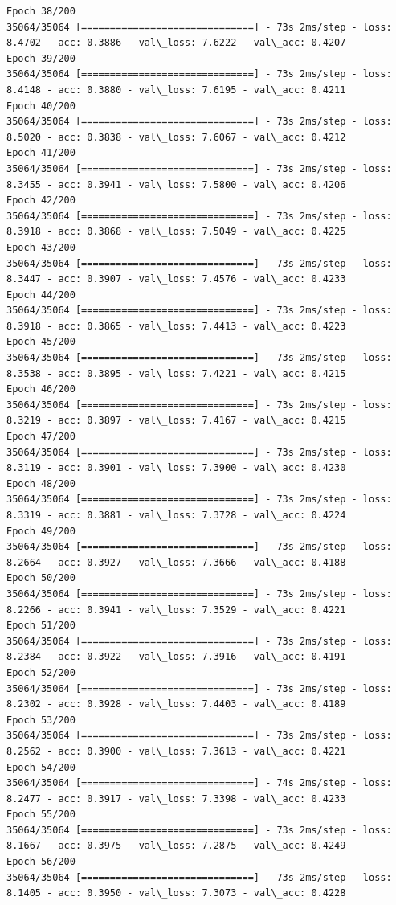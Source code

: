 \documentclass[11pt]{article}
\begin{document}
\begin{Verbatim}[commandchars=\\\{\}]
Epoch 38/200
35064/35064 [==============================] - 73s 2ms/step - loss: 8.4702 - acc: 0.3886 - val\_loss: 7.6222 - val\_acc: 0.4207
Epoch 39/200
35064/35064 [==============================] - 73s 2ms/step - loss: 8.4148 - acc: 0.3880 - val\_loss: 7.6195 - val\_acc: 0.4211
Epoch 40/200
35064/35064 [==============================] - 73s 2ms/step - loss: 8.5020 - acc: 0.3838 - val\_loss: 7.6067 - val\_acc: 0.4212
Epoch 41/200
35064/35064 [==============================] - 73s 2ms/step - loss: 8.3455 - acc: 0.3941 - val\_loss: 7.5800 - val\_acc: 0.4206
Epoch 42/200
35064/35064 [==============================] - 73s 2ms/step - loss: 8.3918 - acc: 0.3868 - val\_loss: 7.5049 - val\_acc: 0.4225
Epoch 43/200
35064/35064 [==============================] - 73s 2ms/step - loss: 8.3447 - acc: 0.3907 - val\_loss: 7.4576 - val\_acc: 0.4233
Epoch 44/200
35064/35064 [==============================] - 73s 2ms/step - loss: 8.3918 - acc: 0.3865 - val\_loss: 7.4413 - val\_acc: 0.4223
Epoch 45/200
35064/35064 [==============================] - 73s 2ms/step - loss: 8.3538 - acc: 0.3895 - val\_loss: 7.4221 - val\_acc: 0.4215
Epoch 46/200
35064/35064 [==============================] - 73s 2ms/step - loss: 8.3219 - acc: 0.3897 - val\_loss: 7.4167 - val\_acc: 0.4215
Epoch 47/200
35064/35064 [==============================] - 73s 2ms/step - loss: 8.3119 - acc: 0.3901 - val\_loss: 7.3900 - val\_acc: 0.4230
Epoch 48/200
35064/35064 [==============================] - 73s 2ms/step - loss: 8.3319 - acc: 0.3881 - val\_loss: 7.3728 - val\_acc: 0.4224
Epoch 49/200
35064/35064 [==============================] - 73s 2ms/step - loss: 8.2664 - acc: 0.3927 - val\_loss: 7.3666 - val\_acc: 0.4188
Epoch 50/200
35064/35064 [==============================] - 73s 2ms/step - loss: 8.2266 - acc: 0.3941 - val\_loss: 7.3529 - val\_acc: 0.4221
Epoch 51/200
35064/35064 [==============================] - 73s 2ms/step - loss: 8.2384 - acc: 0.3922 - val\_loss: 7.3916 - val\_acc: 0.4191
Epoch 52/200
35064/35064 [==============================] - 73s 2ms/step - loss: 8.2302 - acc: 0.3928 - val\_loss: 7.4403 - val\_acc: 0.4189
Epoch 53/200
35064/35064 [==============================] - 73s 2ms/step - loss: 8.2562 - acc: 0.3900 - val\_loss: 7.3613 - val\_acc: 0.4221
Epoch 54/200
35064/35064 [==============================] - 74s 2ms/step - loss: 8.2477 - acc: 0.3917 - val\_loss: 7.3398 - val\_acc: 0.4233
Epoch 55/200
35064/35064 [==============================] - 73s 2ms/step - loss: 8.1667 - acc: 0.3975 - val\_loss: 7.2875 - val\_acc: 0.4249
Epoch 56/200
35064/35064 [==============================] - 73s 2ms/step - loss: 8.1405 - acc: 0.3950 - val\_loss: 7.3073 - val\_acc: 0.4228

\end{Verbatim}
\end{document}
